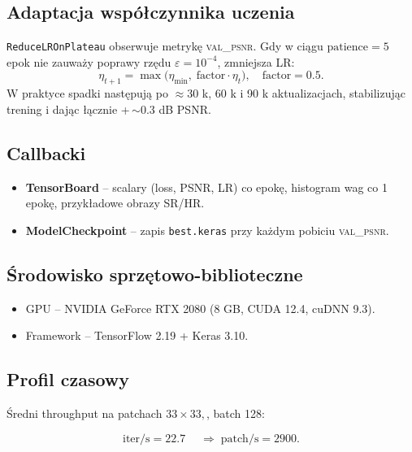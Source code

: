 \documentclass[11pt]{article}
\begin{document}
\subsection{Adaptacja współczynnika uczenia}

\texttt{ReduceLROnPlateau} obserwuje metrykę \textsc{val\_psnr}.
Gdy w ciągu \(\text{patience}=5\) epok nie zauważy poprawy rzędu
\(\varepsilon=10^{-4}\), zmniejsza LR:
\begin{equation}
  \eta_{t+1} =
  \max\bigl(\eta_\text{min},\;
            \text{factor}\cdot\eta_{t}\bigr),
  \quad
  \text{factor}=0.5.
  \label{eq:rlrop}
\end{equation}
W praktyce spadki następują po \(\approx\)30 k, 60 k i 90 k
aktualizacjach, stabilizując trening i dając łącznie
+\,\(\sim\)0.3 dB PSNR.

\subsection{Callbacki}

\begin{itemize}
  \item \textbf{TensorBoard} – scalary (loss, PSNR, LR) co epokę,
        histogram wag co 1 epokę, przykładowe obrazy SR/HR.
  \item \textbf{ModelCheckpoint} – zapis \texttt{best.keras} przy każdym
        pobiciu \textsc{val\_psnr}.
\end{itemize}

\subsection{Środowisko sprzętowo-biblioteczne}

\begin{itemize}
  \item GPU – NVIDIA GeForce RTX 2080 (8 GB, CUDA 12.4, cuDNN 9.3).
  \item Framework – TensorFlow 2.19 + Keras 3.10.
\end{itemize}

\subsection{Profil czasowy}

Średni throughput na patchach
$33 \times 33, $, batch 128:

\[
\text{iter/s}=\num{22.7}\;\quad\Rightarrow\;
\text{patch/s}=\num{2900}.
\]
\end{document}
